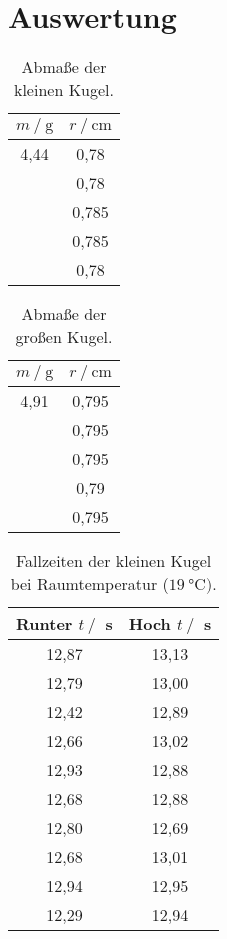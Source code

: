 \section{Auswertung}
\label{sec:Auswertung}

\begin{table}[H]
  \centering
      \caption{Abmaße der kleinen Kugel.}
      \label{tab:klKugel}
      \begin{tabular}{c c}
      \toprule
      $m \:/\: \si{\gram} $ & $r \:/\: \si{\cm}$\\
      \midrule
      4,44 & 0,78 \\ 
       & 0,78 \\
       & 0,785 \\
       & 0,785 \\
       & 0,78 \\
      \bottomrule
  \end{tabular}
\end{table}

\begin{table}[H]
  \centering
      \caption{Abmaße der großen Kugel.}
      \label{tab:grKugel}
      \begin{tabular}{c c}
      \toprule
      $m \:/\: \si{\gram} $ & $r \:/\: \si{\cm}$\\
      \midrule
        4,91 & 0,795 \\ 
       & 0,795 \\
       & 0,795 \\
       & 0,79 \\
       & 0,795 \\
      \bottomrule
  \end{tabular}
\end{table}

\begin{table}[H]
  \centering
      \caption{Fallzeiten der kleinen Kugel bei Raumtemperatur ($\SI{19}{\celsius})$.}
      \label{tab:klKugRaum}
      \begin{tabular}{c c}
      \toprule
      Runter $t\:/\:$ s & Hoch $t\:/\:$ s\\
      \midrule
        12,87 & 13,13 \\
        12,79 & 13,00 \\
        12,42 & 12,89 \\
        12,66 & 13,02 \\
        12,93 & 12,88 \\
        12,68 & 12,88 \\
        12,80 & 12,69 \\
        12,68 & 13,01 \\
        12,94 & 12,95 \\
        12,29 & 12,94 \\
      \bottomrule
  \end{tabular}
\end{table}

